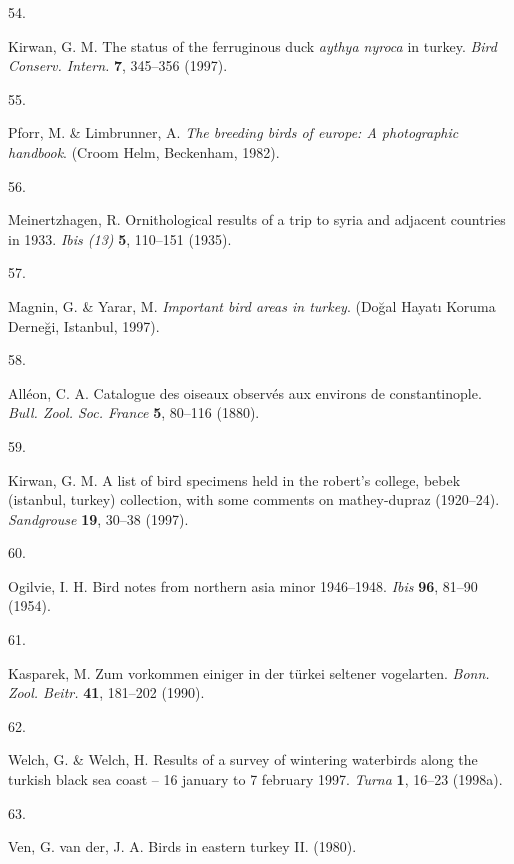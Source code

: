 \documentclass[
  letterpaper,
  DIV=11,
  numbers=noendperiod]{scrreprt}
\newlength{\cslhangindent}
\newlength{\csllabelwidth}
\newlength{\cslentryspacingunit} %
\newenvironment{CSLReferences}[2] %
 {%
  \setlength{\parindent}{0pt}
  \ifodd #1
  \let\oldpar\par
  \def\par{\hangindent=\cslhangindent\oldpar}
  \fi
  \setlength{\parskip}{#2\cslentryspacingunit}
 }%
 {}
\newcommand{\CSLLeftMargin}[1]{\parbox[t]{\csllabelwidth}{#1}}
\newcommand{\CSLRightInline}[1]{\parbox[t]{\linewidth - \csllabelwidth}{#1}\break}
\begin{document}
\begin{CSLReferences}{0}{0}
\leavevmode{}%
\CSLLeftMargin{54. }%
\CSLRightInline{Kirwan, G. M. The status of the ferruginous duck
\emph{aythya nyroca} in turkey. \emph{Bird Conserv. Intern.} \textbf{7},
345--356 (1997).}

\leavevmode{}%
\CSLLeftMargin{55. }%
\CSLRightInline{Pforr, M. \& Limbrunner, A. \emph{The breeding birds of
europe: A photographic handbook}. (Croom Helm, Beckenham, 1982).}

\leavevmode{}%
\CSLLeftMargin{56. }%
\CSLRightInline{Meinertzhagen, R. Ornithological results of a trip to
syria and adjacent countries in 1933. \emph{Ibis (13)} \textbf{5},
110--151 (1935).}

\leavevmode{}%
\CSLLeftMargin{57. }%
\CSLRightInline{Magnin, G. \& Yarar, M. \emph{Important bird areas in
turkey}. (Doğal Hayatı Koruma Derneği, Istanbul, 1997).}

\leavevmode{}%
\CSLLeftMargin{58. }%
\CSLRightInline{Alléon, C. A. Catalogue des oiseaux observés aux
environs de constantinople. \emph{Bull. Zool. Soc. France} \textbf{5},
80--116 (1880).}

\leavevmode{}%
\CSLLeftMargin{59. }%
\CSLRightInline{Kirwan, G. M. A list of bird specimens held in the
robert's college, bebek (istanbul, turkey) collection, with some
comments on mathey-dupraz (1920--24). \emph{Sandgrouse} \textbf{19},
30--38 (1997).}

\leavevmode{}%
\CSLLeftMargin{60. }%
\CSLRightInline{Ogilvie, I. H. Bird notes from northern asia minor
1946--1948. \emph{Ibis} \textbf{96}, 81--90 (1954).}

\leavevmode{}%
\CSLLeftMargin{61. }%
\CSLRightInline{Kasparek, M. Zum vorkommen einiger in der türkei
seltener vogelarten. \emph{Bonn. Zool. Beitr.} \textbf{41}, 181--202
(1990).}

\leavevmode{}%
\CSLLeftMargin{62. }%
\CSLRightInline{Welch, G. \& Welch, H. Results of a survey of wintering
waterbirds along the turkish black sea coast -- 16 january to 7 february
1997. \emph{Turna} \textbf{1}, 16--23 (1998a).}

\leavevmode{}%
\CSLLeftMargin{63. }%
\CSLRightInline{Ven, G. van der, J. A. Birds in eastern turkey II.
(1980).}


\end{CSLReferences}
\end{document}
